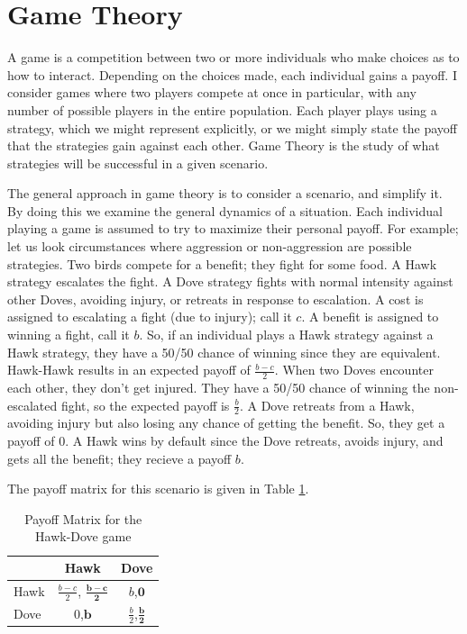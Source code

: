 \documentclass[a4paper,11pt,bcshonoursthesis,singlespace,twoside,thesisdraft,pdflatex]{cssethesis}
\begin{document}
\section{Game Theory}
A game is a competition between two or more individuals who make choices as to how to interact. 
Depending on the choices made, each individual gains a payoff.  
I consider games where two players compete at once in particular, with any number of possible players in the entire population. 
Each player plays using a strategy, which we might represent explicitly, or we might simply state the payoff that the strategies gain against each other. 
Game Theory is the study of what strategies will be successful in a given scenario. 

The general approach in game theory is to consider a scenario, and simplify it. 
By doing this we examine the general dynamics of a situation. 
Each individual playing a game is assumed to try to maximize their personal payoff. 
For example; let us look circumstances where aggression or non-aggression are possible strategies. 
Two birds compete for a benefit; they fight for some food. 
A Hawk strategy escalates the fight. A Dove strategy fights with normal intensity against other Doves, avoiding injury, or retreats in response to escalation. 
A cost is assigned to escalating a fight (due to injury); call it $c$. 
A benefit is assigned to winning a fight, call it $b$. 
So, if an individual plays a Hawk strategy against a Hawk strategy, they have a 50/50 chance of winning since they are equivalent. Hawk-Hawk results in an expected payoff of $\frac{{b}-{c}}{2}$. 
When two Doves encounter each other, they don't get injured. 
They have a 50/50 chance of winning the non-escalated fight, so the expected payoff is $\frac{b}{2}$. 
A Dove retreats from a Hawk, avoiding injury but also losing any chance of getting the benefit. 
So, they get a payoff of $0$. A Hawk wins by default since the Dove retreats, avoids injury, and gets all the benefit; they recieve a payoff $b$. 

The payoff matrix for this scenario is given in Table \ref{table:payoffHD}.
\begin{table}[h]\centering
\captionsetup{justification=centering}
\begin{tabular}{|l|c|c|}
\hline
 & \bf{Hawk} & \bf{Dove}\\
\hline
Hawk & $\frac{{b}-{c}}{2}$, {$\boldsymbol{\frac{{b}-{c}}{2}}$} & $b$,$\boldsymbol{0}$\\
\hline
Dove & $0$,$\boldsymbol{b}$ & $\frac{b}{2}$,$\boldsymbol{\frac{b}{2}}$ \\
\hline
\end{tabular}
\caption{Payoff Matrix for the Hawk-Dove game}
\label{table:payoffHD}
\end{table}
\end{document}
